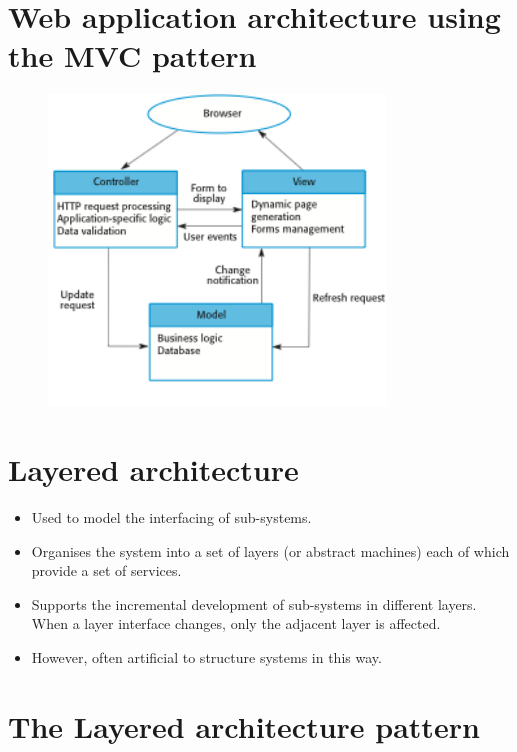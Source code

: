 \section{Web application architecture using the MVC pattern}
\begin{figure}[h!]
    \centering
    \includegraphics[width = 0.8\textwidth]{./figures/L3_3.png}
    \caption{}
    \label{fig:L3_3}
\end{figure}

\section{Layered architecture}
\begin{itemize}
\item Used to model the interfacing of sub-systems.

\item Organises the system into a set of layers (or abstract machines) each of which provide a set of services.

\item Supports the incremental development of sub-systems in different layers. When a layer interface changes, only the adjacent layer is affected.

\item However, often artificial to structure systems in this way.

\end{itemize}
\newpage
\section{The Layered architecture pattern}


